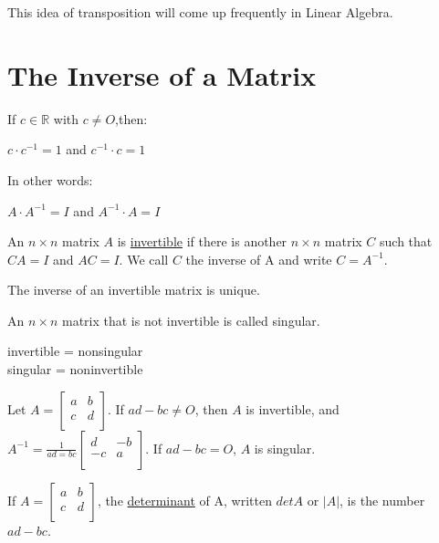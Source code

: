 \documentclass{report}
\begin{document}
\begin{remark}
This idea of transposition will come up frequently in Linear Algebra.
\end{remark}
\section{The Inverse of a Matrix}
\begin{definition}
If $c \in \mathbb{R}$ with $c \neq O$,then:
\begin{center}
$c \cdot c^{-1} = 1$ and $c^{-1} \cdot c = 1$
\end{center}
In other words:
\begin{center}
	$A \cdot A^{-1} = I$ and $A^{-1} \cdot A = I$
\end{center}
\end{definition}

\begin{definition}
An $n\times n$ matrix $A$ is \underline{invertible} if there is another $n\times n$ matrix $C$ such that $CA=I$ and $AC=I$. We call $C$ the inverse of A and write $C=A^{-1}$.
\end{definition}

\begin{proposition}
The inverse of an invertible matrix is unique.
\end{proposition}

\begin{definition}
An $n\times n$ matrix that is not invertible is called singular.
\begin{center}
	invertible = nonsingular\\
	singular = noninvertible
\end{center}
\end{definition}

\begin{theorem}
Let $A = \begin{bmatrix}
a & b \\
c & d \\
\end{bmatrix}$.
If $ad-bc \neq O$, then $A$ is invertible, and $A^{-1} = \frac{1}{ad=bc}\begin{bmatrix}
	d & -b \\
	-c & a \\
\end{bmatrix}$. If $ad - bc = O$, $A$ is singular.
\end{theorem}

\begin{definition}
If $A = \begin{bmatrix}
	a & b \\
	c & d \\
	\end{bmatrix}$, the \underline{determinant} of A, written $detA$ or $|A|$, is the number $ad - bc$.
\end{definition}
\end{document}
